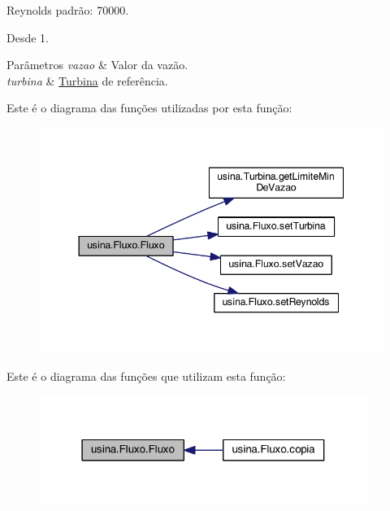 Reynolds padrão\-: 70000. 

\begin{DoxySince}{Desde}
1. 
\end{DoxySince}

\begin{DoxyParams}{Parâmetros}
{\em vazao} & Valor da vazão. \\
\hline
{\em turbina} & \hyperlink{classusina_1_1_turbina}{Turbina} de referência. \\
\hline
\end{DoxyParams}


Este é o diagrama das funções utilizadas por esta função\-:\nopagebreak
\begin{figure}[H]
\begin{center}
\leavevmode
\includegraphics[width=344pt]{classusina_1_1_fluxo_ab85463cd78cac200be698b91c6be1141_cgraph}
\end{center}
\end{figure}




Este é o diagrama das funções que utilizam esta função\-:\nopagebreak
\begin{figure}[H]
\begin{center}
\leavevmode
\includegraphics[width=304pt]{classusina_1_1_fluxo_ab85463cd78cac200be698b91c6be1141_icgraph}
\end{center}
\end{figure}


